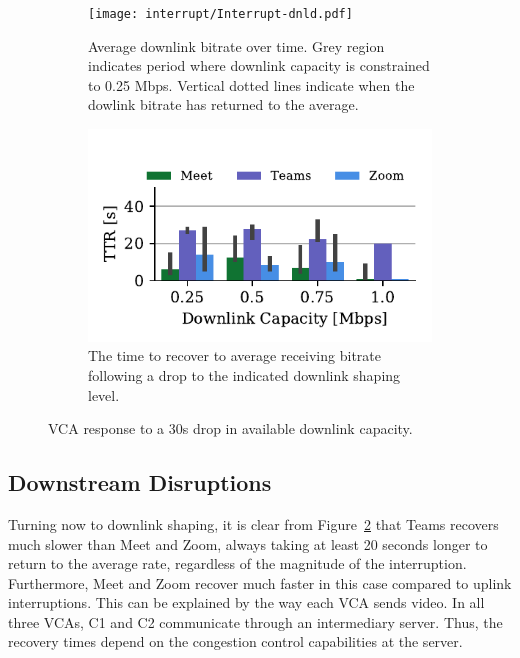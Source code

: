 \begin{figure}[t!]
 \centering
\begin{subfigure}[t]{.5\textwidth}
   \centering
    \texttt{[image: interrupt/Interrupt-dnld.pdf]}
    \caption{Average downlink bitrate over time. Grey region indicates period where downlink capacity is constrained to 0.25 Mbps. Vertical dotted lines indicate when the dowlink bitrate has returned to the average.}
    \label{fig:ts-dnld}
\end{subfigure}
\begin{subfigure}[t]{.5\textwidth}
  \centering
    \includegraphics[width=.9\textwidth,keepaspectratio]{figures/interrupt/TTR-dnld.pdf}
    \caption{The time to recover to average receiving bitrate following a drop to the indicated downlink shaping level.}
    \label{fig:TTR_dnld}
\end{subfigure}
\caption{VCA response to a 30s drop in available downlink capacity.}
\label{fig:interrupt-dnld}
\end{figure}

\subsection{Downstream Disruptions}

Turning now to downlink shaping, it is clear from Figure~\ref{fig:TTR_dnld} that Teams recovers much slower than Meet and Zoom, always taking at least 20 seconds longer to return to the average rate, regardless of the magnitude of the interruption. Furthermore, Meet and Zoom recover much faster in this case compared to uplink interruptions. This can be explained by the way each VCA sends video. In all three VCAs, C1 and C2 communicate through an intermediary server. Thus, the recovery times depend on the congestion control capabilities at the server. 


